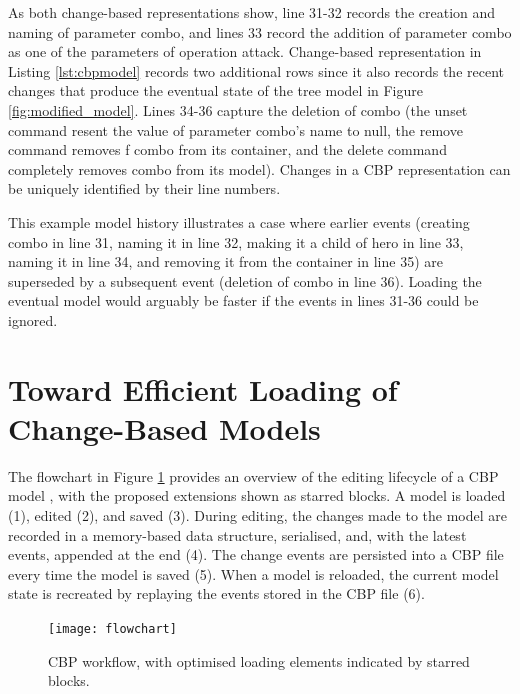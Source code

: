As both change-based representations show, line 31-32 records the creation and naming of parameter \textsf{combo}, and lines 33 record the addition of parameter \textsf{combo} as one of the parameters of operation \textsf{attack}. Change-based representation in Listing \ref{lst:cbpmodel} records two additional rows since it also records the recent changes that produce the eventual state of the tree model in Figure \ref{fig:modified_model}. Lines 34-36 capture the deletion of \textsf{combo} (the \textsf{unset} command resent the value of parameter \textsf{combo}'s name to null, the \textsf{remove} command removes f \textsf{combo} from its container, and the \textsf{delete} command completely removes \textsf{combo} from its model). Changes in a CBP representation can be uniquely identified by their line numbers.

This example model history illustrates a case where earlier events (creating \textsf{combo} in line 31, naming it in line 32, making it a child of \textsf{hero} in line 33, naming it in line 34, and removing it from the container in line 35) are superseded by a subsequent event (deletion of \textsf{combo} in line 36). Loading the eventual model would arguably be faster if the events in lines 31-36 could be ignored.

\section{Toward Efficient Loading of Change-Based Models}
\label{sec:loading_time_optimisation}

The flowchart in Figure \ref{fig:flowchart} provides an overview of the editing lifecycle of a CBP model \cite{DBLP:conf/models/YohannisKP17}, with the proposed extensions shown as starred blocks. A model is loaded (1), edited (2), and saved (3). During editing, the changes made to the model are recorded in a memory-based data structure, serialised, and, with the latest events, appended at the end (4). The change events are persisted into a CBP file every time the model is saved (5). When a model is reloaded, the current model state is recreated by replaying the events stored in the CBP file (6).

\begin{figure}[ht]
  \centering
  \texttt{[image: flowchart]}
  \caption{CBP workflow, with optimised loading elements indicated by starred blocks.}
  \label{fig:flowchart}
\end{figure}

